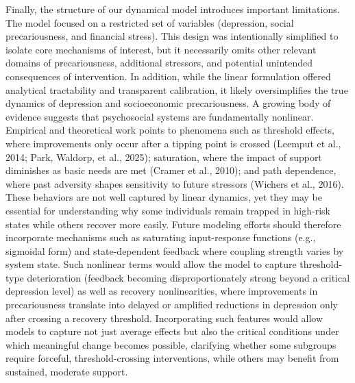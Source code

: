 \documentclass[
]{article}
\begin{document}
Finally, the structure of our dynamical model introduces important
limitations. The model focused on a restricted set of variables
(depression, social precariousness, and financial stress). This design
was intentionally simplified to isolate core mechanisms of interest, but
it necessarily omits other relevant domains of precariousness,
additional stressors, and potential unintended consequences of
intervention. In addition, while the linear formulation offered
analytical tractability and transparent calibration, it likely
oversimplifies the true dynamics of depression and socioeconomic
precariousness. A growing body of evidence suggests that psychosocial
systems are fundamentally nonlinear. Empirical and theoretical work
points to phenomena such as threshold effects, where improvements only
occur after a tipping point is crossed (Leemput et al., 2014; Park,
Waldorp, et al., 2025); saturation, where the impact of support
diminishes as basic needs are met (Cramer et al., 2010); and path
dependence, where past adversity shapes sensitivity to future stressors
(Wichers et al., 2016). These behaviors are not well captured by linear
dynamics, yet they may be essential for understanding why some
individuals remain trapped in high-risk states while others recover more
easily. Future modeling efforts should therefore incorporate mechanisms
such as saturating input-response functions (e.g., sigmoidal form) and
state-dependent feedback where coupling strength varies by system state.
Such nonlinear terms would allow the model to capture threshold-type
deterioration (feedback becoming disproportionately strong beyond a
critical depression level) as well as recovery nonlinearities, where
improvements in precariousness translate into delayed or amplified
reductions in depression only after crossing a recovery threshold.
Incorporating such features would allow models to capture not just
average effects but also the critical conditions under which meaningful
change becomes possible, clarifying whether some subgroups require
forceful, threshold-crossing interventions, while others may benefit
from sustained, moderate support.
\end{document}
